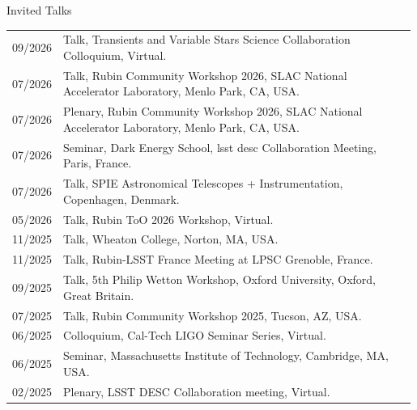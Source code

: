 \begin{rSection}{Invited Talks}
\setlength{\extrarowheight}{3pt}
    \begin{longtable}{p{0.1\linewidth}p{0.89\linewidth}}
    09/2026 & Talk, Transients and Variable Stars Science Collaboration Colloquium, Virtual. \\
    07/2026 & Talk, Rubin Community Workshop 2026, SLAC National Accelerator Laboratory, Menlo Park, CA, USA. \\
    07/2026 & Plenary, Rubin Community Workshop 2026, SLAC National Accelerator Laboratory, Menlo Park, CA, USA. \\
    07/2026 & Seminar, Dark Energy School, \ac{lsst} \ac{desc} Collaboration Meeting, Paris, France. \\
    07/2026 & Talk, SPIE Astronomical Telescopes + Instrumentation, Copenhagen, Denmark. \\
    05/2026 & Talk, Rubin ToO 2026 Workshop, Virtual. \\
    11/2025 & Talk, Wheaton College, Norton, MA, USA. \\
    11/2025 & Talk, Rubin-LSST France Meeting at LPSC Grenoble, France. \\
    09/2025 & Talk, 5th Philip Wetton Workshop, Oxford University, Oxford, Great Britain. \\
    07/2025 & Talk, Rubin Community Workshop 2025, Tucson, AZ, USA. \\
    06/2025 & Colloquium, Cal-Tech LIGO Seminar Series, Virtual. \\
    06/2025 & Seminar, Massachusetts Institute of Technology, Cambridge, MA, USA. \\
    02/2025 & Plenary, LSST DESC Collaboration meeting, Virtual. \\
    \end{longtable}

\end{rSection}

